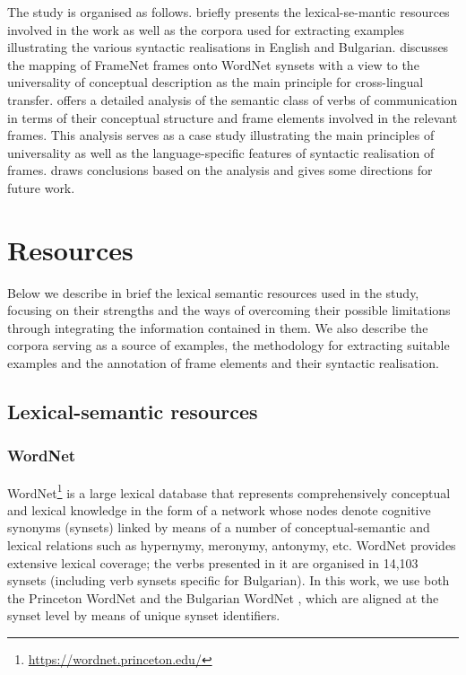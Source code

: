 \documentclass[output=paper,colorlinks,citecolor=brown]{langscibook}
\begin{document}
The study is organised as follows.  briefly presents the lexical-se-mantic resources involved in the work as well as the corpora used for extracting examples illustrating the various syntactic realisations in English and Bulgarian.  discusses the mapping of FrameNet frames onto WordNet synsets with a view to the universality of conceptual description as the main principle for cross-lingual transfer.  offers a detailed analysis of the semantic class of verbs of communication in terms of their conceptual structure and frame elements involved in the relevant frames. This analysis serves as a case study illustrating the main principles of universality as well as the language-specific features of syntactic realisation of frames.  draws conclusions based on the analysis and gives some directions for future work.


\section{Resources}\label{sec:resources}

Below we describe in brief the lexical semantic resources used in the study, focusing on their strengths and the ways of overcoming their possible limitations through integrating the information contained in them. We also describe the corpora serving as a source of examples, the methodology for extracting suitable examples and the annotation of frame elements and their syntactic realisation.
 
\subsection{Lexical-semantic resources}

\subsubsection{WordNet}

WordNet\footnote{\url{https://wordnet.princeton.edu/}} \citep{Miller1995,Fellbaum1998} is a large lexical database that represents comprehensively conceptual and lexical knowledge in the form of a network whose nodes denote cognitive synonyms (synsets) linked by means of a number of conceptual-semantic and lexical relations such as hypernymy, meronymy, antonymy, etc. WordNet provides extensive lexical coverage; the verbs presented in it are organised in 14,103 synsets (including verb synsets specific for Bulgarian). In this work, we use both the Princeton WordNet and the Bulgarian WordNet \citep{koeva2021-wordnet}, which are aligned at the synset level by means of unique synset identifiers. 
\end{document}
